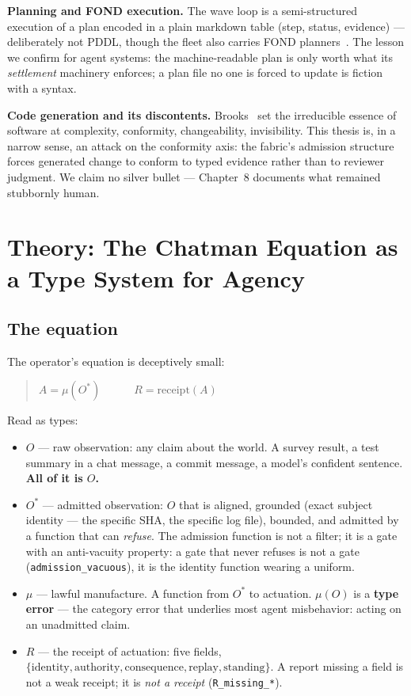 \documentclass[11pt,a4paper]{article}
\theoremstyle{remark}
\newcommand{\Ostar}{$O^{*}$}
\newcommand{\term}[1]{\texttt{#1}}
\begin{document}
\textbf{Planning and FOND execution.} The wave loop is a semi-structured execution of a plan encoded in a plain markdown table (step, status, evidence) --- deliberately not PDDL, though the fleet also carries FOND planners~\cite{ghallab2004}. The lesson we confirm for agent systems: the machine-readable plan is only worth what its \emph{settlement} machinery enforces; a plan file no one is forced to update is fiction with a syntax.

\textbf{Code generation and its discontents.} Brooks~\cite{brooks1987} set the irreducible essence of software at complexity, conformity, changeability, invisibility. This thesis is, in a narrow sense, an attack on the conformity axis: the fabric's admission structure forces generated change to conform to typed evidence rather than to reviewer judgment. We claim no silver bullet --- Chapter~8 documents what remained stubbornly human.

\section{Theory: The Chatman Equation as a Type System for Agency}

\subsection{The equation}
The operator's equation is deceptively small:
\begin{quote}\large
$A = \mu(O^{*}) \qquad\quad R = \mathrm{receipt}(A)$
\end{quote}
Read as types:
\begin{itemize}
\item $O$ --- raw observation: any claim about the world. A survey result, a test summary in a chat message, a commit message, a model's confident sentence. \textbf{All of it is $O$.}
\item \Ostar{} --- admitted observation: $O$ that is aligned, grounded (exact subject identity --- the specific SHA, the specific log file), bounded, and admitted by a function that can \emph{refuse}. The admission function is not a filter; it is a gate with an anti-vacuity property: a gate that never refuses is not a gate (\term{admission\_vacuous}), it is the identity function wearing a uniform.
\item $\mu$ --- lawful manufacture. A function from \Ostar{} to actuation. $\mu(O)$ is a \textbf{type error} --- the category error that underlies most agent misbehavior: acting on an unadmitted claim.
\item $R$ --- the receipt of actuation: five fields, $\{\mathrm{identity, authority, consequence, replay, standing}\}$. A report missing a field is not a weak receipt; it is \emph{not a receipt} (\term{R\_missing\_*}).
\end{itemize}
\end{document}
